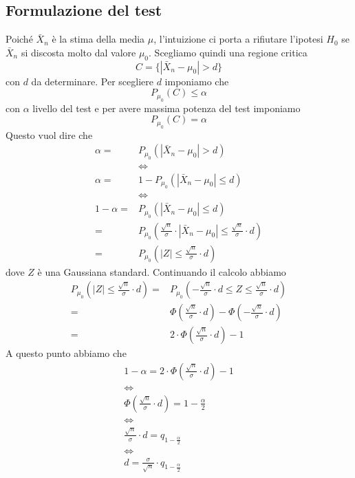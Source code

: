 \subsection{Formulazione del test}
Poiché $\bar{X}_n$ è la stima della media $\mu$, l'intuizione ci porta a rifiutare l'ipotesi $H_0$
se $\bar{X}_n$ si discosta molto dal valore $\mu_0$. Scegliamo quindi una regione critica
\[ C = \{ | \bar{X}_n - \mu_0 | > d \} \]
con $d$ da determinare. Per scegliere $d$ imponiamo che
\[ P_{\mu_0} (C) \leq \alpha \]
con $\alpha$ livello del test e per avere massima potenza del test imponiamo
\[ P_{\mu_0} (C) = \alpha \]
Questo vuol dire che
\begin{align*}
	\alpha =     & P_{\mu_0} (|\bar{X}_n - \mu_0| > d )                              \\
	             & \iff                                                              \\
	\alpha =     & 1 - P_{\mu_0} (|\bar{X}_n - \mu_0| \leq d)                        \\
	             & \iff                                                              \\
	1 - \alpha = & P_{\mu_0} (|\bar{X}_n - \mu_0| \leq d)                            \\
	=            & P_{\mu_0} \left( \frac{\sqrt{n}}{\sigma} \cdot
	|\bar{X}_n - \mu_0| \leq \frac{\sqrt{n}}{\sigma} \cdot d \right)                 \\
	=            & P_{\mu_0} \left( |Z| \leq \frac{\sqrt{n}}{\sigma} \cdot d \right)
\end{align*}
dove $Z$ è una Gaussiana standard. Continuando il calcolo abbiamo
\begin{align*}
	P_{\mu_0} \left( |Z| \leq \frac{\sqrt{n}}{\sigma} \cdot d \right)
	= & P_{\mu_0} \left( -\frac{\sqrt{n}}{\sigma} \cdot d \leq Z
	\leq \frac{\sqrt{n}}{\sigma} \cdot d \right)                        \\
	= & \Phi \left( \frac{\sqrt{n}}{\sigma} \cdot d \right) -
	\Phi \left( -\frac{\sqrt{n}}{\sigma} \cdot d \right)                \\
	= & 2 \cdot \Phi \left( \frac{\sqrt{n}}{\sigma} \cdot d \right) - 1
\end{align*}
A questo punto abbiamo che
\begin{gather*}
	1 - \alpha = 2 \cdot \Phi \left( \frac{\sqrt{n}}{\sigma} \cdot d \right) - 1 \\
	\iff \\
	\Phi \left( \frac{\sqrt{n}}{\sigma} \cdot d \right) = 1 - \frac{\alpha}{2} \\
	\iff \\
	\frac{\sqrt{n}}{\sigma} \cdot d = q_{1 - \frac{\alpha}{2}} \\
	\iff \\
	d = \frac{\sigma}{\sqrt{n}} \cdot q_{1 - \frac{\alpha}{2}}
\end{gather*}
